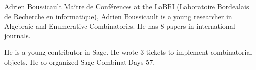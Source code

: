 \begin{participant}[type=R,PM=6,salary=5700,gender=male]{Adrien Boussicault}
  Maître de Conférences at the LaBRI (Laboratoire Bordealais de Recherche en 
  informatique), Adrien Boussicault is a young researcher in Algebraic and 
  Enumerative Combinatorics. He has 8 papers in international journals.
  
  He is a young contributor in Sage. He wrote 3 tickets to implement 
  combinatorial objects. He co-organized Sage-Combinat Days 57.
\end{participant}

